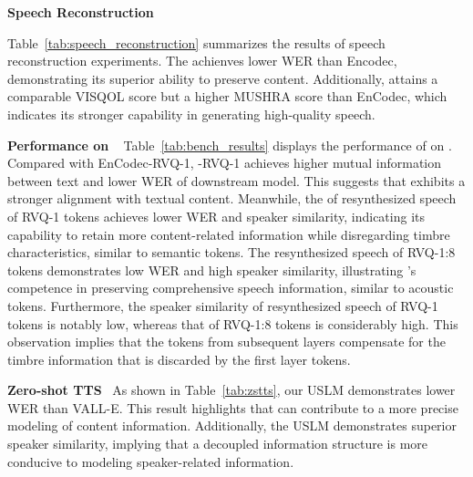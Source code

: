 \textbf{Speech Reconstruction}~

Table~\ref{tab:speech_reconstruction} summarizes the results of speech reconstruction experiments. The \method achienves lower WER than Encodec, demonstrating its superior ability to preserve content. Additionally, \method attains a comparable VISQOL score but a higher MUSHRA score than EnCodec, which indicates its stronger capability in generating high-quality speech. 




\textbf{Performance on \bench }~
Table~\ref{tab:bench_results} displays the performance of \method on \bench. 
Compared with EnCodec-RVQ-1, \method-RVQ-1 achieves higher mutual information between text and lower WER of downstream model. This suggests that \method exhibits a stronger alignment with textual content. Meanwhile, the of resynthesized speech of \method RVQ-1 tokens achieves lower WER and speaker similarity, indicating its capability to retain more content-related information while disregarding timbre characteristics, similar to semantic tokens.
The resynthesized speech of \method RVQ-1:8 tokens demonstrates low WER and high speaker similarity, illustrating \method's competence in preserving comprehensive speech information, similar to acoustic tokens. 
Furthermore, the speaker similarity of resynthesized speech of \method RVQ-1 tokens is notably low, whereas that of \method RVQ-1:8 tokens is considerably high. This observation implies that the tokens from subsequent layers compensate for the timbre information that is discarded by the first layer tokens.




\textbf{Zero-shot TTS}~
As shown in Table~\ref{tab:zstts}, our USLM demonstrates lower WER than VALL-E. This result highlights that \method can contribute to a more precise modeling of content information. Additionally, the USLM demonstrates superior speaker similarity, implying that a decoupled information structure is more conducive to modeling speaker-related information. 


